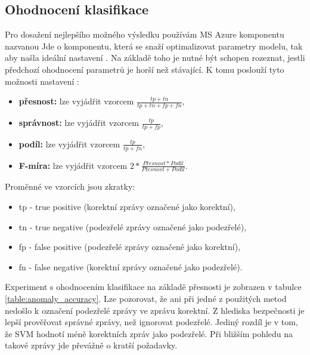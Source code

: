 \documentclass[thesis=M,czech]{FITthesis}[2012/10/20]
\begin{document}
		\subsection{Ohodnocení klasifikace}
			\label{subsec:classification_performance}
			Pro dosažení nejlepšího možného výsledku používám MS Azure komponentu nazvanou  Jde o komponentu, která se snaží optimalizovat parametry modelu, tak aby našla ideální nastavení \cite{msAzure}. Na základě toho je nutné být schopen rozeznat, jestli předchozí ohodnocení parametrů je horší než stávající. K tomu poslouží tyto možnosti nastavení \cite{powers-precision}:
			
			\begin{itemize} 
				\item \textbf{přesnost: }  lze vyjádřit vzorcem $\frac{tp+tn}{tp+tn+fp+fn}$,
				\item \textbf{správnost: } lze vyjádřit vzorcem $\frac{tp}{tp+fp}$,
				\item \textbf{podíl: } lze vyjádřit vzorcem $\frac{tp}{tp+fn}$,
				\item \textbf{F-míra: } lze vyjádřit vzorcem $2 * \frac{Přesnost*Podíl}{Přesnost + Podíl}$.				
			\end{itemize}
		
			Proměnné ve vzorcích jsou zkratky:
			\begin{itemize} 
				\item tp - true positive (korektní zprávy označené jako korektní),
				\item tn - true negative (podezřelé zprávy označené jako podezřelé),
				\item fp - false positive (podezřelé zprávy označené jako korektní),
				\item fn - false negative (korektní zprávy označené jako podezřelé).				
			\end{itemize}
		
			Experiment s ohodnocením klasifikace na základě přesnosti je zobrazen v tabulce \ref{table:anomaly_accuracy}. Lze pozorovat, že ani při jedné z použitých metod nedošlo k označení podezřelé zprávy ve zprávu korektní. Z hlediska bezpečnosti je lepší prověřovat správné zprávy, než ignorovat podezřelé. Jediný rozdíl je v tom, že SVM hodnotí méně korektních zpráv jako podezřelé. Při bližším pohledu na takové zprávy jde převážně o kratší požadavky.
			
\end{document}
